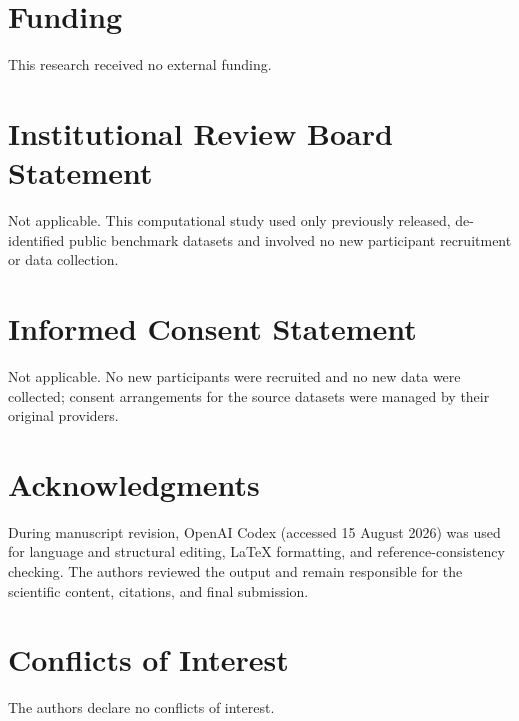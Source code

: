 \documentclass[jimaging,article,submit,pdftex,moreauthors]{Definitions/mdpi}%
\providecommand{\funding}[1]{\section*{Funding}#1}
\providecommand{\institutionalreview}[1]{\section*{Institutional Review Board Statement}#1}
\providecommand{\informedconsent}[1]{\section*{Informed Consent Statement}#1}
\providecommand{\acknowledgments}[1]{\section*{Acknowledgments}#1}
\providecommand{\conflictsofinterest}[1]{\section*{Conflicts of Interest}#1}
\begin{document}
\funding{This research received no external funding.}




\institutionalreview{Not applicable. This computational study used only previously released, de-identified public benchmark datasets and involved no new participant recruitment or data collection.}




\informedconsent{Not applicable. No new participants were recruited and no new data were collected; consent arrangements for the source datasets were managed by their original providers.}




\acknowledgments{During manuscript revision, OpenAI Codex (accessed 15 August 2026) was used for language and structural editing, LaTeX formatting, and reference-consistency checking. The authors reviewed the output and remain responsible for the scientific content, citations, and final submission.}



\conflictsofinterest{The authors declare no conflicts of interest.}






\end{document}
